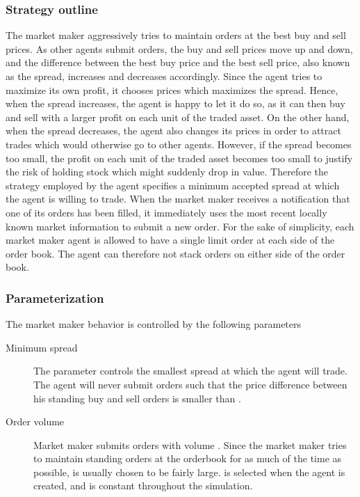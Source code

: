 \subsubsection{Strategy outline}
The market maker aggressively tries to maintain orders at the best buy and sell prices. As other agents submit orders, the buy and sell prices move up and down, and the difference between the best buy price and the best sell price, also known as the spread, increases and decreases accordingly. Since the agent tries to maximize its own profit, it chooses prices which maximizes the spread. Hence, when the spread increases, the agent is happy to let it do so, as it can then buy and sell with a larger profit on each unit of the traded asset. On the other hand, when the spread decreases, the agent also changes its prices in order to attract trades which would otherwise go to other agents. However, if the spread becomes too small, the profit on each unit of the traded asset becomes too small to justify the risk of holding stock which might suddenly drop in value. Therefore the strategy employed by the agent specifies a minimum accepted spread at which the agent is willing to trade. When the market maker receives a notification that one of its orders has been filled, it immediately uses the most recent locally known market information to submit a new order. For the sake of simplicity, each market maker agent is allowed to have a single limit order at each side of the order book. The agent can therefore not stack orders on either side of the order book. 

\subsubsection{Parameterization}
The market maker behavior is controlled by the following parameters
\begin{description}
\item[Minimum spread] The parameter  controls the smallest spread at which the agent will trade. The agent will never submit orders such that the price difference between his standing buy and sell orders is smaller than \ssmmlatencyagent{}.
\item[Order volume] Market maker  submits orders with volume . Since the market maker tries to maintain standing orders at the orderbook for as much of the time as possible,  is usually chosen to be fairly large.  is selected when the agent is created, and is constant throughout the simulation.
\end{description}


